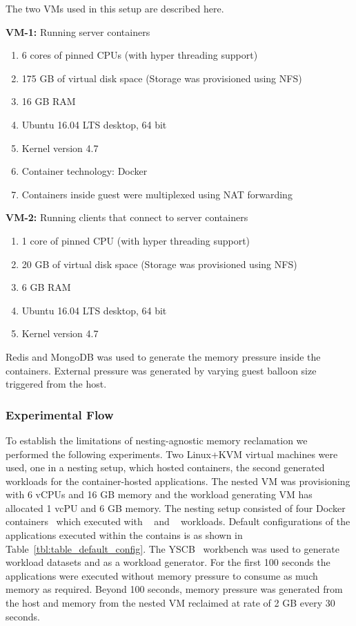 	The two VMs used in this setup are described here.
	
	\noindent \textbf{VM-1:} Running server containers
	\begin{enumerate}
	  \item 6 cores of pinned CPUs (with hyper threading support)
	  \item 175 GB of virtual disk space (Storage was provisioned using NFS)
	  \item 16 GB RAM
	  \item Ubuntu 16.04 LTS desktop, 64 bit
	  \item Kernel version 4.7
	  \item Container technology: Docker
	  \item Containers inside guest were multiplexed using NAT forwarding
	\end{enumerate}
	
	\noindent \textbf{VM-2:} Running clients that connect to server containers
	\begin{enumerate}
	  \item 1 core of pinned CPU (with hyper threading support)
	  \item 20 GB of virtual disk space (Storage was provisioned using NFS)
	  \item 6 GB RAM
	  \item Ubuntu 16.04 LTS desktop, 64 bit
	  \item Kernel version 4.7
	\end{enumerate}
	
	Redis and MongoDB was used to generate the memory pressure inside the containers. External pressure was generated by varying guest 
balloon size triggered from the host.

      
    \subsubsection{Experimental Flow}
      
      To establish the limitations of nesting-agnostic memory reclamation we performed
      the following experiments. Two Linux+KVM virtual machines were used, one in a nesting setup,
      which hosted containers, the second generated workloads for the 
      container-hosted applications. The nested VM was provisioning with 6 vCPUs
      and 16 GB memory and the workload generating VM has allocated 1 vcPU and 6 GB memory.
      The nesting setup consisted of four Docker containers~\cite{docker}
      which executed with \redis{}~\cite{Redis} and
      \mongo{}~\cite{Mongodb} workloads. 
      Default configurations of the applications executed within
      the contains is as shown in Table~\ref{tbl:table_default_config}.
      The YSCB~\cite{cooper2010benchmarking} workbench was used to generate workload datasets and 
      as a workload generator. For the first 100 seconds the applications were executed without 
      memory pressure to consume as much memory as required. Beyond 100 seconds, memory pressure
      was generated from the host and memory from the nested VM reclaimed at rate of 2 GB
      every 30 seconds.

